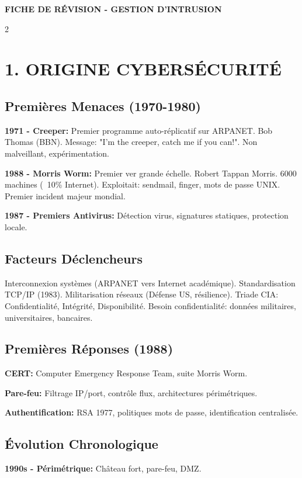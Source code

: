 \documentclass[9pt,a4paper]{extarticle}
\begin{document}
\begin{center}
\textbf{\large FICHE DE RÉVISION - GESTION D'INTRUSION}
\end{center}

\begin{multicols}{2}

\section*{1. ORIGINE CYBERSÉCURITÉ}

\subsection*{Premières Menaces (1970-1980)}
\textbf{1971 - Creeper:} Premier programme auto-réplicatif sur ARPANET. Bob Thomas (BBN). Message: "I'm the creeper, catch me if you can!". Non malveillant, expérimentation.

\textbf{1988 - Morris Worm:} Premier ver grande échelle. Robert Tappan Morris. 6000 machines (~10\% Internet). Exploitait: sendmail, finger, mots de passe UNIX. Premier incident majeur mondial.

\textbf{1987 - Premiers Antivirus:} Détection virus, signatures statiques, protection locale.

\subsection*{Facteurs Déclencheurs}
Interconnexion systèmes (ARPANET vers Internet académique). Standardisation TCP/IP (1983). Militarisation réseaux (Défense US, résilience). Triade CIA: Confidentialité, Intégrité, Disponibilité. Besoin confidentialité: données militaires, universitaires, bancaires.

\subsection*{Premières Réponses (1988)}
\textbf{CERT:} Computer Emergency Response Team, suite Morris Worm.

\textbf{Pare-feu:} Filtrage IP/port, contrôle flux, architectures périmétriques.

\textbf{Authentification:} RSA 1977, politiques mots de passe, identification centralisée.

\subsection*{Évolution Chronologique}
\textbf{1990s - Périmétrique:} Château fort, pare-feu, DMZ.


\end{multicols}
\end{document}
